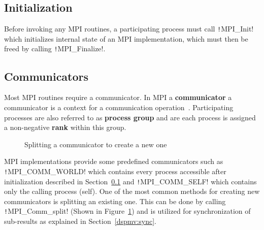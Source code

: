 \documentclass[thesis=M,english]{FITthesis}[2019/12/23]
\newcommand{\csre}[1]{\texttt!#1!}
\begin{document}
\subsection{Initialization}\label{tech:mpi:init}

Before invoking any MPI routines, a participating process must call \csre{MPI_Init} which
initializes internal state of an MPI implementation, which must then be freed by calling
\csre{MPI_Finalize}.

\subsection{Communicators}\label{tech:mpi:comm}

Most MPI routines require a communicator. In MPI a \textbf{communicator} a communicator is a
context for a communication operation~\cite{mpi40}. Participating processes are also referred to as
\textbf{process group} and are each process is assigned a non-negative \textbf{rank} within this group.

\begin{figure}[htp]
    \centering
    \caption{Splitting a communicator to create a new one}\label{tech:mpi:comm:fig}
\end{figure}

MPI implementations provide some predefined
communicators such as \csre{MPI_COMM_WORLD} which contains every process accessible
after initialization described in Section~\ref{tech:mpi:init} and \csre{MPI_COMM_SELF}
which contains only the calling process (self). One of the most common methods for creating
new communicators is splitting an existing one. This can be done by calling
\csre{MPI_Comm_split} (Shown in Figure~\ref{tech:mpi:comm:fig}) and is utilized for synchronization
of sub-results as explained in Section~\ref{dspmv:sync}.
\end{document}
